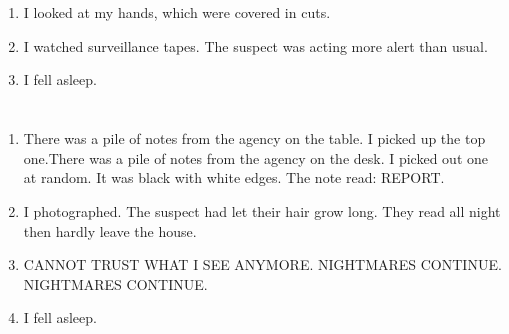 \documentclass{article}
\begin{document}
    \newpage
    
    \section{}
    
    \begin{enumerate}
    
    \item I looked at my hands, which were covered in cuts.\\
    
    \item I watched surveillance tapes. The suspect was acting more alert than usual.\\
    
    \item I fell asleep.\\
    
    \end{enumerate}
     
    \newpage
    
    \section{}
    
    \begin{enumerate}
    
    \item There was a pile of notes from the agency on the table. I picked up the top one.There was a pile of notes from the agency on the desk. I picked out one at random. It was black with white edges. The note read: REPORT.\\
    
    \item I photographed. The suspect had let their hair grow long. They read all night then hardly leave the house.\\
    
    \item CANNOT TRUST WHAT I SEE ANYMORE. NIGHTMARES CONTINUE. NIGHTMARES CONTINUE.\\
    
    \item I fell asleep.\\
    
    \end{enumerate}
     
    \newpage
    
    \section{}
    
\end{document}
